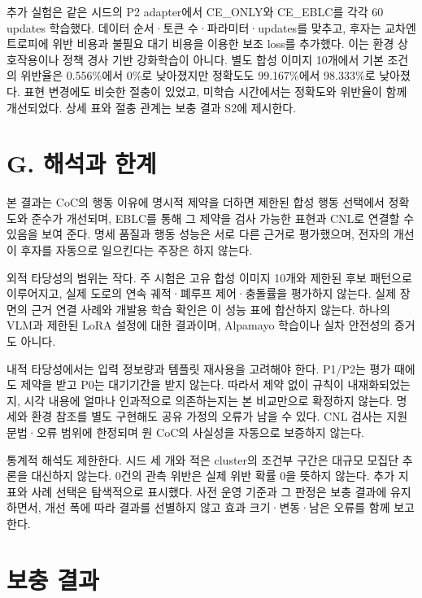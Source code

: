 \documentclass[11pt,a4paper]{article}
\begin{document}
추가 실험은 같은 시드의 P2 adapter에서 CE\_ONLY와 CE\_EBLC를 각각 60 updates 학습했다. 데이터 순서·토큰 수·파라미터·updates를 맞추고, 후자는 교차엔트로피에 위반 비용과 불필요 대기 비용을 이용한 보조 loss를 추가했다. 이는 환경 상호작용이나 정책 경사 기반 강화학습이 아니다. 별도 합성 이미지 10개에서 기본 조건의 위반율은 0.556\%에서 0\%로 낮아졌지만 정확도도 99.167\%에서 98.333\%로 낮아졌다. 표현 변경에도 비슷한 절충이 있었고, 미학습 시간에서는 정확도와 위반율이 함께 개선되었다. 상세 표와 절충 관계는 보충 결과 S2에 제시한다.\par

\section*{G. 해석과 한계}

본 결과는 CoC의 행동 이유에 명시적 제약을 더하면 제한된 합성 행동 선택에서 정확도와 준수가 개선되며, EBLC를 통해 그 제약을 검사 가능한 표현과 CNL로 연결할 수 있음을 보여 준다. 명세 품질과 행동 성능은 서로 다른 근거로 평가했으며, 전자의 개선이 후자를 자동으로 일으킨다는 주장은 하지 않는다.\par

외적 타당성의 범위는 작다. 주 시험은 고유 합성 이미지 10개와 제한된 후보 패턴으로 이루어지고, 실제 도로의 연속 궤적·폐루프 제어·충돌률을 평가하지 않는다. 실제 장면의 근거 연결 사례와 개발용 학습 확인은 이 성능 표에 합산하지 않는다. 하나의 VLM과 제한된 LoRA 설정에 대한 결과이며, Alpamayo 학습이나 실차 안전성의 증거도 아니다.\par

내적 타당성에서는 입력 정보량과 템플릿 재사용을 고려해야 한다. P1/P2는 평가 때에도 제약을 받고 P0는 대기기간을 받지 않는다. 따라서 제약 없이 규칙이 내재화되었는지, 시각 내용에 얼마나 인과적으로 의존하는지는 본 비교만으로 확정하지 않는다. 명세와 환경 참조를 별도 구현해도 공유 가정의 오류가 남을 수 있다. CNL 검사는 지원 문법·오류 범위에 한정되며 원 CoC의 사실성을 자동으로 보증하지 않는다.\par

통계적 해석도 제한한다. 시드 세 개와 적은 cluster의 조건부 구간은 대규모 모집단 추론을 대신하지 않는다. 0건의 관측 위반은 실제 위반 확률 0을 뜻하지 않는다. 추가 지표와 사례 선택은 탐색적으로 표시했다. 사전 운영 기준과 그 판정은 보충 결과에 유지하면서, 개선 폭에 따라 결과를 선별하지 않고 효과 크기·변동·남은 오류를 함께 보고한다.\par

\section*{보충 결과}
\end{document}
